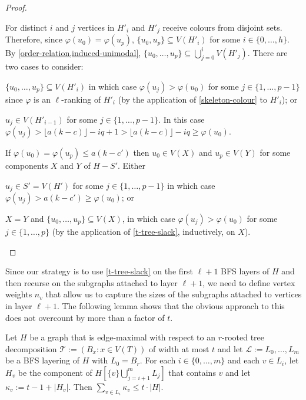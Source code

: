 \documentclass[kpfonts]{patmorin}
\theoremstyle{named}
\begin{document}
\begin{proof}
\begin{compactenum}
        For distinct $i$ and $j$ vertices in $H'_i$ and $H'_j$ receive colours from disjoint sets.  Therefore, since $\varphi(u_0)=\varphi(u_p)$,  $\{u_0,u_p\}\subseteq V(H'_i)$ for some $i\in\{0,\ldots,h\}$.  By \cref{order-relation,induced-unimodal}, $\{u_0,\ldots,u_{p}\}\subseteq \bigcup_{j=0}^{i} V(H'_j)$.  There are two cases to consider:
        \begin{compactenum}
           \item $\{u_0,\ldots,u_{p}\}\subseteq V(H'_i)$ in which case $\varphi(u_j)>\varphi(u_0)$ for some $j\in\{1,\ldots,p-1\}$ since $\varphi$ is an $\ell$-ranking of $H'_i$ (by the application of \cref{skeleton-colour} to $H'_i$); or
           \item $u_j\in V(H'_{i-1})$ for some $j\in\{1,\ldots,p-1\}$.  In this case $\varphi(u_j)>\lfloor a(k-c)\rfloor-iq + 1 > \lfloor a(k-c)\rfloor-iq \ge \varphi(u_0)$.
       \end{compactenum}
       \item If $\varphi(u_0)=\varphi(u_p) \le a(k-c')$ then $u_0\in V(X)$ and $u_p\in V(Y)$ for some components $X$ and $Y$ of $H-S'$.  Either
       \begin{compactenum}
            \item $u_j\in S'=V(H')$ for some $j\in\{1,\ldots,p-1\}$ in which case $\varphi(u_j)>a(k-c')\ge\varphi(u_0)$; or
            \item $X=Y$ and $\{u_0,\ldots,u_p\}\subseteq V(X)$, in which case $\varphi(u_j)>\varphi(u_0)$ for some $j\in\{1,\ldots,p\}$ (by the application of \cref{t-tree-slack}, inductively, on $X$). \qedhere
        \end{compactenum}
    \end{compactenum}
\end{proof}

Since our strategy is to use \cref{t-tree-slack} on the first $\ell+1$ BFS layers of $H$ and then recurse on the subgraphs attached to layer $\ell+1$, we need to define vertex weights $n_v$ that allow us to capture the sizes of the subgraphs attached to vertices in layer $\ell+1$.  The following lemma shows that the obvious approach to this does not overcount by more than a factor of $t$.

\begin{lem}\label{size-claim}
    Let $H$ be a graph that is edge-maximal with respect to an $r$-rooted tree decomposition $\mathcal{T}:=(B_x:x\in V(T))$ of width at most $t$ and let $\mathcal{L}:=L_0,\ldots,L_m$ be a BFS layering of $H$ with $L_0=B_r$.  For each $i\in\{0,\ldots,m\}$ and each $v\in L_i$, let $H_v$ be the component of $H[\{v\}\bigcup_{j=i+1}^m L_j]$ that contains $v$ and let $\kappa_v:= t-1+|H_v|$.  Then $\sum_{v\in L_i} \kappa_v \le t\cdot|H|$.
\end{lem}
\end{document}
